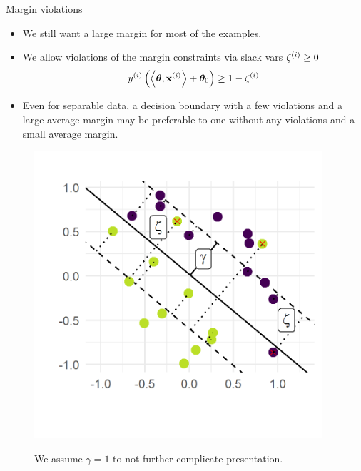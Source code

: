 \documentclass[11pt,compress,t,notes=noshow, xcolor=table]{beamer}
\begin{document}
\begin{vbframe}{Margin violations}

  \begin{itemize}
    \item We still want a large margin for most of the examples.
    \item We allow violations of the margin constraints via slack vars $\zeta^{(i)} \geq 0$
    $$
    y^{(i)} \left( \left\langle \bm{\theta}, \mathbf{x}^{(i)} \right\rangle + \bm{\theta}_0 \right) \geq 1 - \zeta^{(i)}
    $$
    \item Even for separable data, a decision boundary with a few violations and a large average margin may be preferable to one without any violations and a small average margin.
\end{itemize}

\begin{figure}[htbp]
	\begin{minipage}{0.5\textwidth}
\begin{center}
 \includegraphics[width = 0.95\textwidth]{figure/boundary_with_violations.png} 
\end{center}
	\end{minipage}
	\hfill
	\begin{minipage}{0.35\textwidth}
 We assume $\gamma=1$ to not further complicate presentation.
	\end{minipage}
\end{figure}


\end{vbframe}
\end{document}

